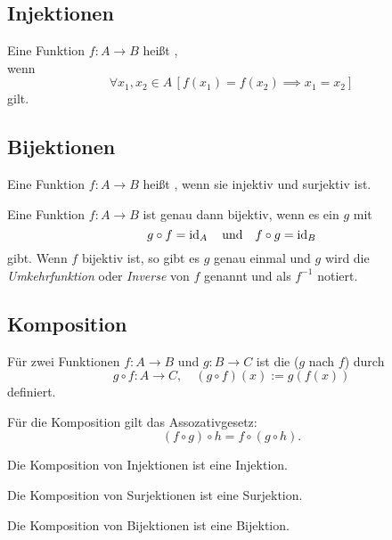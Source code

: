 \subsection{Injektionen}
\begin{Definition}
Eine Funktion $f\colon A\to B$ heißt ,\\
wenn
\begin{equation}
\forall x_1,x_2\in A\,[f(x_1)=f(x_2)\implies x_1=x_2]
\end{equation}
gilt.
\end{Definition}

\subsection{Bijektionen}
\begin{Definition}
Eine Funktion $f\colon A\to B$ heißt ,
wenn sie injektiv und surjektiv ist.

Eine Funktion $f\colon A\to B$ ist genau dann bijektiv, wenn es
ein $g$ mit
\begin{equation}
g\circ f = \operatorname{id}_A\quad\text{und}\quad f\circ g = \operatorname{id}_B
\end{equation}
gibt. Wenn $f$ bijektiv ist, so gibt es $g$ genau einmal und
$g$ wird die \emph{Umkehrfunktion}
oder \emph{Inverse}
von $f$ genannt und als $f^{-1}$ notiert.
\end{Definition}

\subsection{Komposition}
\begin{Definition} Für zwei Funktionen $f\colon A\to B$
und $g\colon B\to C$ ist die 
($g$ nach $f$)
durch
\begin{equation}\label{eq:composition}
g\circ f\colon A\to C,\quad (g\circ f)(x) := g(f(x))
\end{equation}
definiert.
\end{Definition}
Für die Komposition gilt das Assozativgesetz:
\begin{equation}
(f\circ g)\circ h = f\circ(g\circ h).
\end{equation}

Die Komposition von Injektionen ist eine Injektion.

Die Komposition von Surjektionen ist eine Surjektion.

Die Komposition von Bijektionen ist eine Bijektion.

